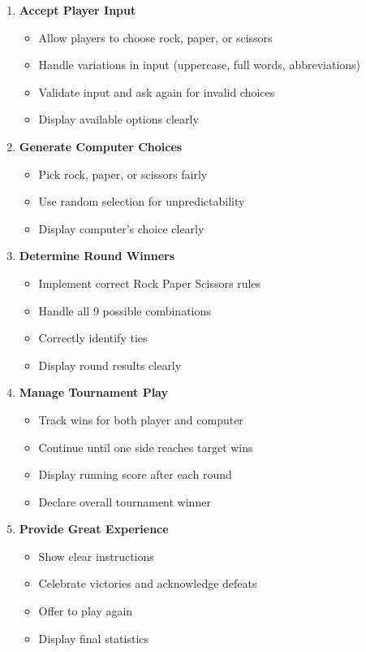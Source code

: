 \documentclass[
  letterpaper,
  DIV=11,
  numbers=noendperiod,
  oneside]{scrreprt}
\providecommand{\tightlist}{%
  \setlength{\itemsep}{0pt}\setlength{\parskip}{0pt}}\usepackage{longtable,booktabs,array}
\begin{document}
\begin{enumerate}
\def\labelenumi{\arabic{enumi}.}
\tightlist
\item
  \textbf{Accept Player Input}

  \begin{itemize}
  \tightlist
  \item
    Allow players to choose rock, paper, or scissors
  \item
    Handle variations in input (uppercase, full words, abbreviations)
  \item
    Validate input and ask again for invalid choices
  \item
    Display available options clearly
  \end{itemize}
\item
  \textbf{Generate Computer Choices}

  \begin{itemize}
  \tightlist
  \item
    Pick rock, paper, or scissors fairly
  \item
    Use random selection for unpredictability
  \item
    Display computer's choice clearly
  \end{itemize}
\item
  \textbf{Determine Round Winners}

  \begin{itemize}
  \tightlist
  \item
    Implement correct Rock Paper Scissors rules
  \item
    Handle all 9 possible combinations
  \item
    Correctly identify ties
  \item
    Display round results clearly
  \end{itemize}
\item
  \textbf{Manage Tournament Play}

  \begin{itemize}
  \tightlist
  \item
    Track wins for both player and computer
  \item
    Continue until one side reaches target wins
  \item
    Display running score after each round
  \item
    Declare overall tournament winner
  \end{itemize}
\item
  \textbf{Provide Great Experience}

  \begin{itemize}
  \tightlist
  \item
    Show clear instructions
  \item
    Celebrate victories and acknowledge defeats
  \item
    Offer to play again
  \item
    Display final statistics
  \end{itemize}
\end{enumerate}
\end{document}
